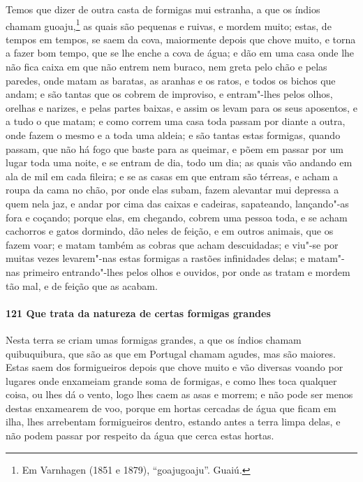 Temos que dizer de outra casta de formigas mui estranha, a que os índios chamam
guoaju,\footnote{ Em Varnhagen (1851 e 1879), ``goajugoaju''. Guaiú.} as quais são
pequenas e ruivas, e mordem muito; estas, de tempos em tempos, se saem da cova, maiormente
depois que chove muito, e torna a fazer bom tempo, que se lhe enche a cova de água; e dão
em uma casa onde lhe não fica caixa em que não entrem nem buraco, nem greta pelo chão e
pelas paredes, onde matam as baratas, as aranhas e os ratos, e todos os bichos que andam;
e são tantas que os cobrem de improviso, e entram"-lhes pelos olhos, orelhas e narizes, e
pelas partes baixas, e assim os levam para os seus aposentos, e a tudo o que matam; e como
correm uma casa toda passam por diante a outra, onde fazem o mesmo e a toda uma aldeia; e
são tantas estas formigas, quando passam, que não há fogo que baste para as queimar, e
põem em passar por um lugar toda uma noite, e se entram de dia, todo um dia; as quais vão
andando em ala de mil em cada fileira; e se as casas em que entram são térreas, e acham a
roupa da cama no chão, por onde elas subam, fazem alevantar mui depressa a quem nela jaz,
e andar por cima das caixas e cadeiras, sapateando, lançando"-as fora e coçando; porque
elas, em chegando, cobrem uma pessoa toda, e se acham cachorros e gatos dormindo, dão
neles de feição, e em outros animais, que os fazem voar; e matam também as cobras que
acham descuidadas; e viu"-se por muitas vezes levarem"-nas estas formigas a rastões
infinidades delas; e matam"-nas primeiro entrando"-lhes pelos olhos e ouvidos, por onde as
tratam e mordem tão mal, e de feição que as acabam.

\paragraph{121 Que trata da natureza de certas formigas grandes}

Nesta terra se criam umas formigas grandes, a que os índios chamam quibuquibura, que são
as que em Portugal chamam agudes, mas são maiores. Estas saem dos formigueiros depois que
chove muito e vão diversas voando por lugares onde enxameiam grande soma de formigas, e
como lhes toca qualquer coisa, ou lhes dá o vento, logo lhes caem as asas e morrem; e não
pode ser menos destas enxamearem de voo, porque em hortas cercadas de água que ficam em
ilha, lhes arrebentam formigueiros dentro, estando antes a terra limpa delas, e não podem
passar por respeito da água que cerca estas hortas.

